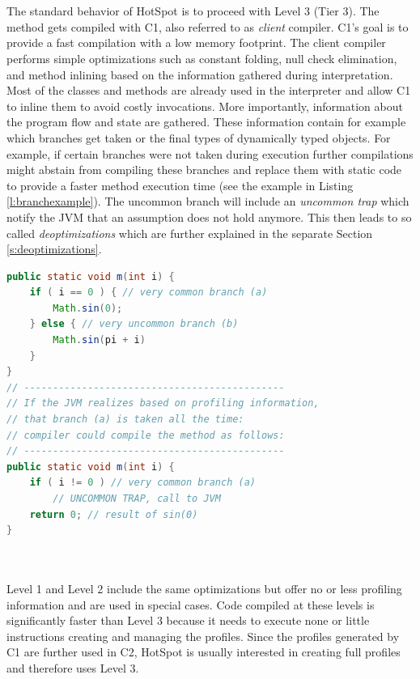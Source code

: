 \\\\
The standard behavior of HotSpot is to proceed with Level 3 (Tier 3). The method gets compiled with C1, also referred to as \textit{client} compiler.
C1's goal is to provide a fast compilation with a low memory footprint.
The client compiler performs simple optimizations such as constant folding, null check elimination, and method inlining based on the information gathered during interpretation. 
Most of the classes and methods are already used in the interpreter and allow C1 to inline them to avoid costly invocations.
More importantly, information about the program flow and state are gathered. These information contain for example which branches get taken or the final types of dynamically typed objects. 
For example, if certain branches were not taken during execution further compilations might abstain from compiling these branches and replace them with static code to provide a faster method execution time (see the example in Listing \ref{l:branchexample}). The uncommon branch will include an \textit{uncommon trap} which notify the JVM that an assumption does not hold anymore. This then leads to so called \textit{deoptimizations} which are further explained in the separate Section \ref{s:deoptimizations}.
\begin{lstlisting}[float,caption=Example that show potential compilation based on profiling information,label=l:branchexample,language=Java]
public static void m(int i) {
    if ( i == 0 ) { // very common branch (a)
        Math.sin(0);
    } else { // very uncommon branch (b)
        Math.sin(pi + i)
    }
}
// ---------------------------------------------
// If the JVM realizes based on profiling information,
// that branch (a) is taken all the time:
// compiler could compile the method as follows:
// ---------------------------------------------
public static void m(int i) {
    if ( i != 0 ) // very common branch (a)
        // UNCOMMON TRAP, call to JVM
    return 0; // result of sin(0)
}
\end{lstlisting}
\\\\
Level 1 and Level 2 include the same optimizations but offer no or less profiling information and are used in special cases. Code compiled at these levels is significantly faster than Level 3 because it needs to execute none or little instructions creating and managing the profiles. Since the profiles generated by C1 are further used in C2, HotSpot is usually interested in creating full profiles and therefore uses Level 3.
